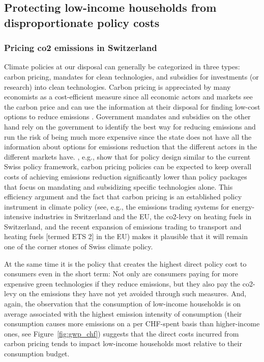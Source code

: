 \documentclass[a4paper,11pt,abstract=true]{scrartcl}
\begin{document}
\subsection{Protecting low-income households from disproportionate policy costs}
\label{sec:ptp}

\subsubsection*{Pricing \ac{co2} emissions in Switzerland}
\label{sec:ch_co2}

Climate policies at our disposal can generally be categorized in three types:
carbon pricing, mandates for clean technologies, and subsidies for investments (or research) into clean technologies.
Carbon pricing is appreciated by many economists as a cost-efficient measure since all economic actors and markets see the carbon price and can use the information at their disposal for finding low-cost options to reduce emissions \citep{boyce_carbon_2018}.
Government mandates and subsidies on the other hand rely on the government to identify the best way for reducing emissions and run the risk of being much more expensive since the state does not have all the information about options for emissions reduction that the different actors in the different markets have.
\citet{landis_efficient_2019}, e.g., show that for policy design similar to the current Swiss policy framework, carbon pricing policies can be expected to keep overall costs of achieving emissions reduction significantly lower than policy packages that focus on mandating and subsidizing specific technologies alone.
This efficiency argument and the fact that carbon pricing is an established policy instrument in climate policy (see, e.g., the emissions trading systems for energy-intensive industries in Switzerland and the EU, the \ac{co2}-levy on heating fuels in Switzerland, and the recent expansion of emissions trading to transport and heating fuels [termed ETS 2] in the EU) makes it plausible that it will remain one of the corner stones of Swiss climate policy.

At the same time it is the policy that creates the highest direct policy cost to consumers even in the short term:
Not only are consumers paying for more expensive green technologies if they reduce emissions, but they also pay the \ac{co2}-levy on the emissions they have not yet avoided through such measures.
And, again, the observation that the consumption of low-income households is on average associated with the highest emission intensity of consumption (their consumption causes more emissions on a per CHF-spent basis than higher-income ones, see Figure~\ref{fig:gwp_chf}) suggests that the direct costs incurred from carbon pricing tends to impact low-income households most relative to their consumption budget.
\end{document}
